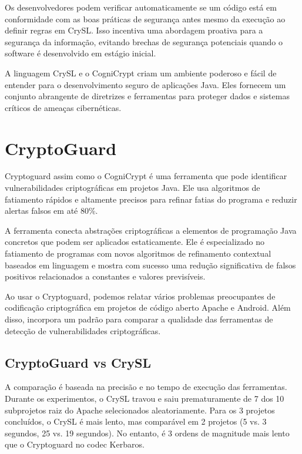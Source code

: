 Os desenvolvedores podem verificar automaticamente se um código está em conformidade com as boas práticas de segurança antes mesmo da execução ao definir regras em CrySL. Isso incentiva uma abordagem proativa para a segurança da informação, evitando brechas de segurança potenciais quando o software é desenvolvido em estágio inicial.

A linguagem CrySL e o CogniCrypt criam um ambiente poderoso e fácil de entender para o desenvolvimento seguro de aplicações Java. Eles fornecem um conjunto abrangente de diretrizes e ferramentas para proteger dados e sistemas críticos de ameaças cibernéticas.

\section{CryptoGuard} %

Cryptoguard assim como o CogniCrypt é uma ferramenta que pode identificar vulnerabilidades criptográficas em projetos Java. Ele usa algoritmos de fatiamento rápidos e altamente precisos para refinar fatias do programa e reduzir alertas falsos em até 80\%. 

A ferramenta conecta abstrações criptográficas a elementos de programação Java concretos que podem ser aplicados estaticamente. Ele é especializado no fatiamento de programas com novos algoritmos de refinamento contextual baseados em linguagem e mostra com sucesso uma redução significativa de falsos positivos relacionados a constantes e valores previsíveis. 

Ao usar o Cryptoguard, podemos relatar vários problemas preocupantes de codificação criptográfica em projetos de código aberto Apache e Android. Além disso, incorpora um padrão para comparar a qualidade das ferramentas de detecção de vulnerabilidades criptográficas.

\subsection{CryptoGuard vs CrySL} %

A comparação é baseada na precisão e no tempo de execução das ferramentas. Durante os experimentos, o CrySL travou e saiu prematuramente de 7 dos 10 subprojetos raiz do Apache selecionados aleatoriamente. Para os 3 projetos concluídos, o CrySL é mais lento, mas comparável em 2 projetos (5 vs. 3 segundos, 25 vs. 19 segundos). No entanto, é 3 ordens de magnitude mais lento que o Cryptoguard no codec Kerbaros. 

